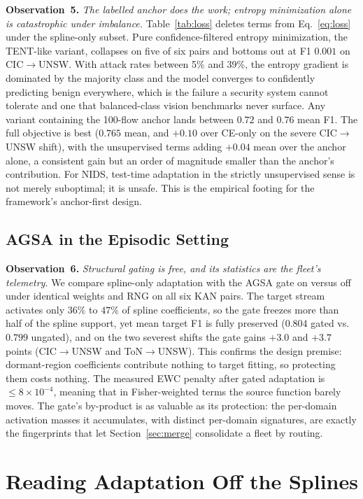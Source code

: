 \documentclass[10pt, conference, letterpaper]{IEEEtran}
\newcommand{\obs}[1]{\vspace{2pt}\noindent\textbf{Observation~#1.}}
\begin{document}
\obs{5} \emph{The labelled anchor does the work; entropy minimization
alone is catastrophic under imbalance.} Table~\ref{tab:loss} deletes
terms from Eq.~\eqref{eq:loss} under the spline-only subset. Pure
confidence-filtered entropy minimization, the TENT-like variant,
collapses on five of six pairs and bottoms out at F1 $0.001$ on
CIC$\to$UNSW. With attack rates between 5\% and 39\%, the entropy
gradient is dominated by the majority class and the model converges to
confidently predicting benign everywhere, which is the failure a
security system cannot tolerate and one that balanced-class vision
benchmarks never surface. Any variant containing the 100-flow anchor
lands between $0.72$ and $0.76$ mean F1. The full objective is best
($0.765$ mean, and $+0.10$ over CE-only on the severe CIC$\to$UNSW
shift), with the unsupervised terms adding $+0.04$ mean over the anchor
alone, a consistent gain but an order of magnitude smaller than the
anchor's contribution. For NIDS, test-time adaptation in the strictly
unsupervised sense \cite{wang2021tent} is not merely suboptimal; it is
unsafe. This is the empirical footing for the framework's anchor-first
design.

\subsection{AGSA in the Episodic Setting}\label{sec:agsa}
\obs{6} \emph{Structural gating is free, and its statistics are the
fleet's telemetry.} We compare spline-only adaptation with the AGSA
gate on versus off under identical weights and RNG on all six KAN
pairs. The target stream activates only $36\%$ to $47\%$ of spline
coefficients, so the gate freezes more than half of the spline
support, yet mean target F1 is fully preserved ($0.804$ gated vs.\
$0.799$ ungated), and on the two severest shifts the gate gains
$+3.0$ and $+3.7$ points (CIC$\to$UNSW and ToN$\to$UNSW). This
confirms the design premise: dormant-region coefficients contribute
nothing to target fitting, so protecting them costs nothing. The
measured EWC penalty after gated adaptation is
$\leq 8\times 10^{-4}$, meaning that in Fisher-weighted terms the
source function barely moves. The gate's by-product is as valuable as
its protection: the per-domain activation masses it accumulates, with
distinct per-domain signatures, are exactly the fingerprints that let
Section~\ref{sec:merge} consolidate a fleet by routing.

\section{Reading Adaptation Off the Splines}\label{sec:splines}
\end{document}
